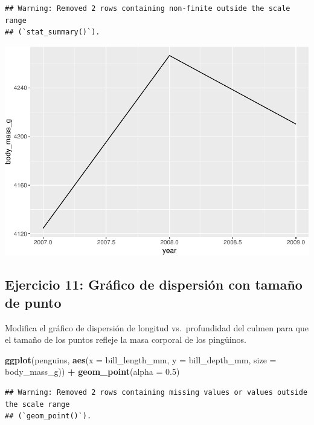 \documentclass[
]{book}
\newenvironment{Shaded}{\begin{snugshade}}{\end{snugshade}}
\newcommand{\AttributeTok}[1]{\textcolor[rgb]{0.13,0.29,0.53}{#1}}
\newcommand{\FloatTok}[1]{\textcolor[rgb]{0.00,0.00,0.81}{#1}}
\newcommand{\FunctionTok}[1]{\textcolor[rgb]{0.13,0.29,0.53}{\textbf{#1}}}
\newcommand{\NormalTok}[1]{#1}
\newcommand{\SpecialCharTok}[1]{\textcolor[rgb]{0.81,0.36,0.00}{\textbf{#1}}}
\begin{document}
\begin{verbatim}
## Warning: Removed 2 rows containing non-finite outside the scale range
## (`stat_summary()`).
\end{verbatim}

\includegraphics{bookdown-demo_files/figure-latex/unnamed-chunk-209-1.pdf}

\hypertarget{ejercicio-11-gruxe1fico-de-dispersiuxf3n-con-tamauxf1o-de-punto-1}{%
\subsection{Ejercicio 11: Gráfico de dispersión con tamaño de punto}\label{ejercicio-11-gruxe1fico-de-dispersiuxf3n-con-tamauxf1o-de-punto-1}}

Modifica el gráfico de dispersión de longitud vs.~profundidad del culmen para que el tamaño de los puntos refleje la masa corporal de los pingüinos.

\begin{Shaded}
\begin{Highlighting}[]
\FunctionTok{ggplot}\NormalTok{(penguins, }\FunctionTok{aes}\NormalTok{(}\AttributeTok{x =}\NormalTok{ bill\_length\_mm, }\AttributeTok{y =}\NormalTok{ bill\_depth\_mm, }\AttributeTok{size =}\NormalTok{ body\_mass\_g)) }\SpecialCharTok{+}
  \FunctionTok{geom\_point}\NormalTok{(}\AttributeTok{alpha =} \FloatTok{0.5}\NormalTok{)}
\end{Highlighting}
\end{Shaded}

\begin{verbatim}
## Warning: Removed 2 rows containing missing values or values outside the scale range
## (`geom_point()`).
\end{verbatim}
\end{document}
